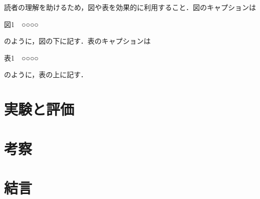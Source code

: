\documentclass[11pt,a4paper,draft]{jarticle} %
\begin{document}
読者の理解を助けるため，図や表を効果的に利用すること．図のキャプションは

\begin{center}図1　○○○○\end{center}

のように，図の下に記す．表のキャプションは

\begin{center}表1　○○○○\end{center}

のように，表の上に記す．

\section{実験と評価}

\section{考察}

\section{結言}

\printbibliography[title=参考文献]
\end{document}
